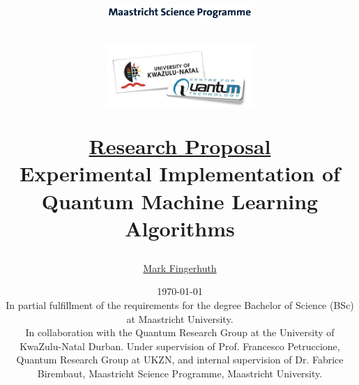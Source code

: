\documentclass[a4paper]{article}
\newcommand*{\0}{$\ket{0}$}
\newcommand*{\1}{$\ket{1}$}
\begin{document}
\title{
\vspace{0.5cm}
\begin{figure}[!ht]
\centering
\includegraphics[width=0.5\textwidth]{MSC2.png}
\end{figure}
\vspace{0.3cm}
\begin{figure}[!ht]
\centering
\includegraphics[width=0.5\textwidth]{logo.jpeg}
\end{figure}
\vspace{1.6cm}
\Huge{ \underline{Research Proposal} \\ \vspace{1cm} \bf Experimental Implementation of Quantum Machine Learning Algorithms \\ \vspace{1cm}}}
\author{\Large \href{mailto:m.fingerhuth@student.maastrichtuniversity.nl}{Mark Fingerhuth}
}
\date{
\today \\
\vspace{1.0cm}
\footnotesize{
In partial fulfillment of the requirements for the degree Bachelor of Science (BSc) at Maastricht University. \\}
\vspace{3.5cm}
\normalsize
In collaboration with the Quantum Research Group at the University of KwaZulu-Natal Durban. Under supervision of Prof. Francesco Petruccione, Quantum Research Group at UKZN, and internal supervision of Dr. Fabrice Birembaut, Maastricht Science Programme, Maastricht University.
}
\maketitle
\setlength{\parindent}{0pt}

\end{document}
